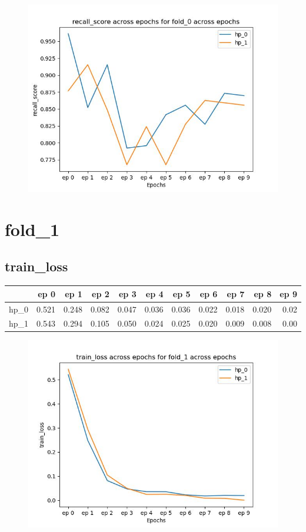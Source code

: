 \documentclass{article}
\begin{document}
\begin{figure}[H]
\includegraphics[scale = 0.75]{fold_0/recall_score}
\end{figure}
\section{fold\_1}
\subsection{train\_loss}
\begin{tabular}{lrrrrrrrrrr}
\toprule
{} &   ep 0 &   ep 1 &   ep 2 &   ep 3 &   ep 4 &   ep 5 &   ep 6 &   ep 7 &   ep 8 &  ep 9 \\
\midrule
hp\_0 &  0.521 &  0.248 &  0.082 &  0.047 &  0.036 &  0.036 &  0.022 &  0.018 &  0.020 &  0.02 \\
hp\_1 &  0.543 &  0.294 &  0.105 &  0.050 &  0.024 &  0.025 &  0.020 &  0.009 &  0.008 &  0.00 \\
\bottomrule
\end{tabular}

\begin{figure}[H]
\includegraphics[scale = 0.75]{fold_1/train_loss}
\end{figure}
\end{document}

